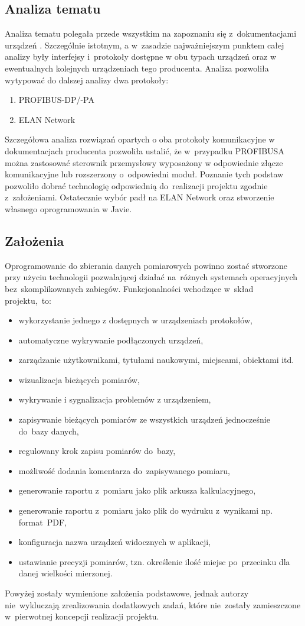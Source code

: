 \subsection{Analiza tematu}
Analiza tematu polegała przede wszystkim na zapoznaniu się z~dokumentacjami urządzeń \cite{u23,u6}. Szczególnie istotnym, a w~zasadzie najważniejszym punktem całej analizy były interfejsy i~protokoły dostępne w obu typach urządzeń oraz w ewentualnych kolejnych urządzeniach tego producenta.
Analiza pozwoliła wytypować do dalszej analizy dwa protokoły:
\begin{enumerate}
\item PROFIBUS-DP/-PA
\item ELAN Network
\end{enumerate}
Szczegółowa analiza rozwiązań opartych o oba protokoły komunikacyjne w dokumentacjach producenta \cite{elan,step7,comm} pozwoliła ustalić, że w~przypadku PROFIBUSA można zastosować sterownik przemysłowy wyposażony w odpowiednie złącze komunikacyjne lub rozszerzony o~odpowiedni moduł.
Poznanie tych podstaw pozwoliło dobrać technologię odpowiednią do~realizacji projektu zgodnie z~założeniami. Ostatecznie wybór padł na ELAN Network oraz stworzenie własnego oprogramowania w Javie.

\subsection{Założenia}
Oprogramowanie do zbierania danych pomiarowych powinno zostać stworzone przy użyciu technologii pozwalającej działać na~różnych systemach operacyjnych bez~skomplikowanych zabiegów. Funkcjonalności wchodzące w~skład projektu,~to:
\begin{itemize}
\item wykorzystanie jednego z dostępnych w urządzeniach protokołów,
\item automatyczne wykrywanie podłączonych urządzeń,
\item zarządzanie użytkownikami, tytułami naukowymi, miejscami, obiektami itd.
\item wizualizacja bieżących pomiarów,
\item wykrywanie i sygnalizacja problemów z urządzeniem,
\item zapisywanie bieżących pomiarów ze wszystkich urządzeń jednocześnie do~bazy danych,
\item regulowany krok zapisu pomiarów do~bazy,
\item możliwość dodania komentarza do~zapisywanego pomiaru,
\item generowanie raportu z~pomiaru jako plik arkusza kalkulacyjnego,
\item generowanie raportu z~pomiaru jako plik do wydruku z~wynikami np. format~PDF,
\item konfiguracja nazwa urządzeń widocznych w aplikacji,
\item ustawianie precyzji pomiarów, tzn. określenie ilość miejsc po~przecinku dla danej wielkości mierzonej.
\end{itemize}
\indent
\indent Powyżej zostały wymienione założenia podstawowe, jednak autorzy nie~wykluczają zrealizowania dodatkowych zadań, które nie~zostały zamieszczone w~pierwotnej koncepcji realizacji projektu.

